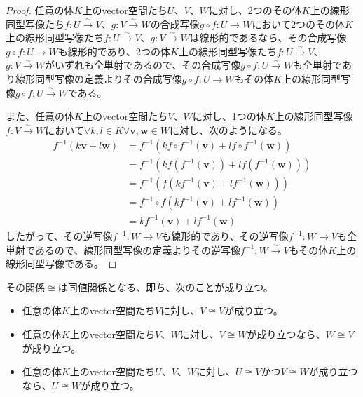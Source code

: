 \documentclass[dvipdfmx]{jsarticle}
\begin{document}
\begin{proof}
任意の体$K$上のvector空間たち$U$、$V$、$W$に対し、2つのその体$K$上の線形同型写像たち$f:U\overset{\sim}{\rightarrow}V$、$g:V\overset{\sim}{\rightarrow}W$の合成写像$g \circ f:U \rightarrow W$において2つのその体$K$上の線形同型写像たち$f:U\overset{\sim}{\rightarrow}V$、$g:V\overset{\sim}{\rightarrow}W$は線形的であるなら、その合成写像$g \circ f:U \rightarrow W$も線形的であり、2つの体$K$上の線形同型写像たち$f:U\overset{\sim}{\rightarrow}V$、$g:V\overset{\sim}{\rightarrow}W$がいずれも全単射であるので、その合成写像$g \circ f:U\overset{\sim}{\rightarrow}W$も全単射であり線形同型写像の定義よりその合成写像$g \circ f:U \rightarrow W$もその体$K$上の線形同型写像$g \circ f:U\overset{\sim}{\rightarrow}W$である。\par
また、任意の体$K$上のvector空間たち$V$、$W$に対し、1つの体$K$上の線形同型写像$f:V\overset{\sim}{\rightarrow}W$において$\forall k,l \in K\forall\mathbf{v},\mathbf{w} \in W$に対し、次のようになる。
\begin{align*}
f^{- 1}\left( k\mathbf{v} + l\mathbf{w} \right) &= f^{- 1}\left( kf \circ f^{- 1}\left( \mathbf{v} \right) + lf \circ f^{- 1}\left( \mathbf{w} \right) \right)\\
&= f^{- 1}\left( kf\left( f^{- 1}\left( \mathbf{v} \right) \right) + lf\left( f^{- 1}\left( \mathbf{w} \right) \right) \right)\\
&= f^{- 1}\left( f\left( kf^{- 1}\left( \mathbf{v} \right) + lf^{- 1}\left( \mathbf{w} \right) \right) \right)\\
&= f^{- 1} \circ f\left( kf^{- 1}\left( \mathbf{v} \right) + lf^{- 1}\left( \mathbf{w} \right) \right)\\
&= kf^{- 1}\left( \mathbf{v} \right) + lf^{- 1}\left( \mathbf{w} \right)
\end{align*}
したがって、その逆写像$f^{- 1}:W \rightarrow V$も線形的であり、その逆写像$f^{- 1}:W \rightarrow V$も全単射であるので、線形同型写像の定義よりその逆写像$f^{- 1}:W\overset{\sim}{\rightarrow}V$もその体$K$上の線形同型写像である。
\end{proof}
\begin{thm}\label{2.1.2.5}
その関係$\cong$は同値関係となる、即ち、次のことが成り立つ。
\begin{itemize}
\item
  任意の体$K$上のvector空間たち$V$に対し、$V \cong V$が成り立つ。
\item
  任意の体$K$上のvector空間たち$V$、$W$に対し、$V \cong W$が成り立つなら、$W \cong V$が成り立つ。
\item
  任意の体$K$上のvector空間たち$U$、$V$、$W$に対し、$U \cong V$かつ$V \cong W$が成り立つなら、$U \cong W$が成り立つ。
\end{itemize}
\end{thm}
\end{document}
